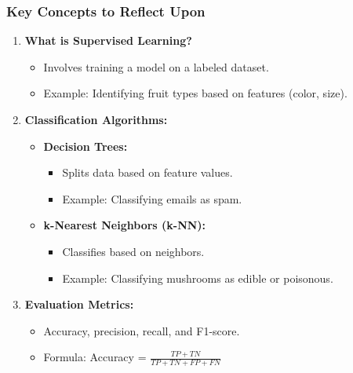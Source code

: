 \documentclass[aspectratio=169]{beamer}
\begin{document}
\begin{frame}[fragile]
    \frametitle{Key Concepts to Reflect Upon}
    \begin{enumerate}
        \item \textbf{What is Supervised Learning?}
        \begin{itemize}
            \item Involves training a model on a labeled dataset.
            \item Example: Identifying fruit types based on features (color, size).
        \end{itemize}
        
        \item \textbf{Classification Algorithms:}
        \begin{itemize}
            \item \textbf{Decision Trees:} 
            \begin{itemize}
                \item Splits data based on feature values.
                \item Example: Classifying emails as spam.
            \end{itemize}
            
            \item \textbf{k-Nearest Neighbors (k-NN):} 
            \begin{itemize}
                \item Classifies based on neighbors.
                \item Example: Classifying mushrooms as edible or poisonous.
            \end{itemize}
        \end{itemize}
        
        \item \textbf{Evaluation Metrics:}
        \begin{itemize}
            \item Accuracy, precision, recall, and F1-score.
            \item Formula: Accuracy = $\frac{TP + TN}{TP + TN + FP + FN}$
        \end{itemize}
    \end{enumerate}
\end{frame}
\end{document}
